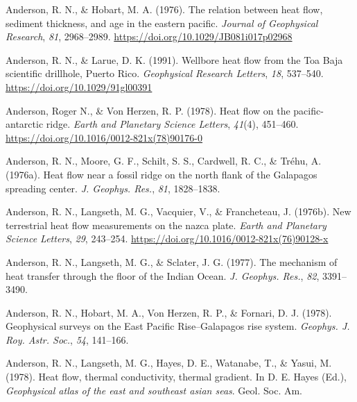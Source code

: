 \documentclass[draft,linenumbers]{agujournal2018}
\begin{document}
\leavevmode{}%
Anderson, R. N., \& Hobart, M. A. (1976). The relation between heat
flow, sediment thickness, and age in the eastern pacific. \emph{Journal
of Geophysical Research}, \emph{81}, 2968--2989.
\url{https://doi.org/10.1029/JB081i017p02968}

\leavevmode{}%
Anderson, R. N., \& Larue, D. K. (1991). Wellbore heat flow from the
{Toa Baja} scientific drillhole, {Puerto Rico}. \emph{Geophysical
Research Letters}, \emph{18}, 537--540.
\url{https://doi.org/10.1029/91gl00391}

\leavevmode{}%
Anderson, Roger N., \& Von Herzen, R. P. (1978). Heat flow on the
pacific-antarctic ridge. \emph{Earth and Planetary Science Letters},
\emph{41}(4), 451--460.
\url{https://doi.org/10.1016/0012-821x(78)90176-0}

\leavevmode{}%
Anderson, R. N., Moore, G. F., Schilt, S. S., Cardwell, R. C., \& Tréhu,
A. (1976a). Heat flow near a fossil ridge on the north flank of the
{Galapagos} spreading center. \emph{J. Geophys. Res.}, \emph{81},
1828--1838.

\leavevmode{}%
Anderson, R. N., Langseth, M. G., Vacquier, V., \& Francheteau, J.
(1976b). New terrestrial heat flow measurements on the nazca plate.
\emph{Earth and Planetary Science Letters}, \emph{29}, 243--254.
\url{https://doi.org/10.1016/0012-821x(76)90128-x}

\leavevmode{}%
Anderson, R. N., Langseth, M. G., \& Sclater, J. G. (1977). The
mechanism of heat transfer through the floor of the {Indian Ocean}.
\emph{J. Geophys. Res.}, \emph{82}, 3391--3490.

\leavevmode{}%
Anderson, R. N., Hobart, M. A., Von Herzen, R. P., \& Fornari, D. J.
(1978). Geophysical surveys on the {East Pacific Rise--Galapagos} rise
system. \emph{Geophys. J. Roy. Astr. Soc.}, \emph{54}, 141--166.

\leavevmode{}%
Anderson, R. N., Langseth, M. G., Hayes, D. E., Watanabe, T., \& Yasui,
M. (1978). Heat flow, thermal conductivity, thermal gradient. In D. E.
Hayes (Ed.), \emph{Geophysical atlas of the east and southeast asian
seas}. Geol. Soc. Am.
\end{document}
